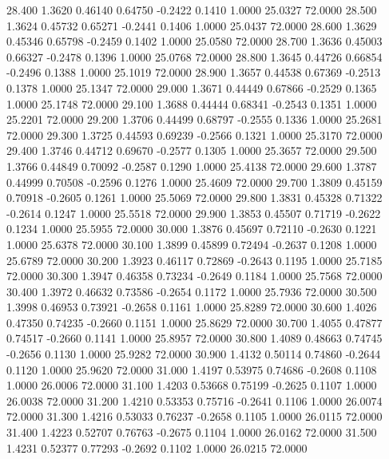   28.400   1.3620   0.46140   0.64750  -0.2422   0.1410   1.0000  25.0327  72.0000
  28.500   1.3624   0.45732   0.65271  -0.2441   0.1406   1.0000  25.0437  72.0000
  28.600   1.3629   0.45346   0.65798  -0.2459   0.1402   1.0000  25.0580  72.0000
  28.700   1.3636   0.45003   0.66327  -0.2478   0.1396   1.0000  25.0768  72.0000
  28.800   1.3645   0.44726   0.66854  -0.2496   0.1388   1.0000  25.1019  72.0000
  28.900   1.3657   0.44538   0.67369  -0.2513   0.1378   1.0000  25.1347  72.0000
  29.000   1.3671   0.44449   0.67866  -0.2529   0.1365   1.0000  25.1748  72.0000
  29.100   1.3688   0.44444   0.68341  -0.2543   0.1351   1.0000  25.2201  72.0000
  29.200   1.3706   0.44499   0.68797  -0.2555   0.1336   1.0000  25.2681  72.0000
  29.300   1.3725   0.44593   0.69239  -0.2566   0.1321   1.0000  25.3170  72.0000
  29.400   1.3746   0.44712   0.69670  -0.2577   0.1305   1.0000  25.3657  72.0000
  29.500   1.3766   0.44849   0.70092  -0.2587   0.1290   1.0000  25.4138  72.0000
  29.600   1.3787   0.44999   0.70508  -0.2596   0.1276   1.0000  25.4609  72.0000
  29.700   1.3809   0.45159   0.70918  -0.2605   0.1261   1.0000  25.5069  72.0000
  29.800   1.3831   0.45328   0.71322  -0.2614   0.1247   1.0000  25.5518  72.0000
  29.900   1.3853   0.45507   0.71719  -0.2622   0.1234   1.0000  25.5955  72.0000
  30.000   1.3876   0.45697   0.72110  -0.2630   0.1221   1.0000  25.6378  72.0000
  30.100   1.3899   0.45899   0.72494  -0.2637   0.1208   1.0000  25.6789  72.0000
  30.200   1.3923   0.46117   0.72869  -0.2643   0.1195   1.0000  25.7185  72.0000
  30.300   1.3947   0.46358   0.73234  -0.2649   0.1184   1.0000  25.7568  72.0000
  30.400   1.3972   0.46632   0.73586  -0.2654   0.1172   1.0000  25.7936  72.0000
  30.500   1.3998   0.46953   0.73921  -0.2658   0.1161   1.0000  25.8289  72.0000
  30.600   1.4026   0.47350   0.74235  -0.2660   0.1151   1.0000  25.8629  72.0000
  30.700   1.4055   0.47877   0.74517  -0.2660   0.1141   1.0000  25.8957  72.0000
  30.800   1.4089   0.48663   0.74745  -0.2656   0.1130   1.0000  25.9282  72.0000
  30.900   1.4132   0.50114   0.74860  -0.2644   0.1120   1.0000  25.9620  72.0000
  31.000   1.4197   0.53975   0.74686  -0.2608   0.1108   1.0000  26.0006  72.0000
  31.100   1.4203   0.53668   0.75199  -0.2625   0.1107   1.0000  26.0038  72.0000
  31.200   1.4210   0.53353   0.75716  -0.2641   0.1106   1.0000  26.0074  72.0000
  31.300   1.4216   0.53033   0.76237  -0.2658   0.1105   1.0000  26.0115  72.0000
  31.400   1.4223   0.52707   0.76763  -0.2675   0.1104   1.0000  26.0162  72.0000
  31.500   1.4231   0.52377   0.77293  -0.2692   0.1102   1.0000  26.0215  72.0000
